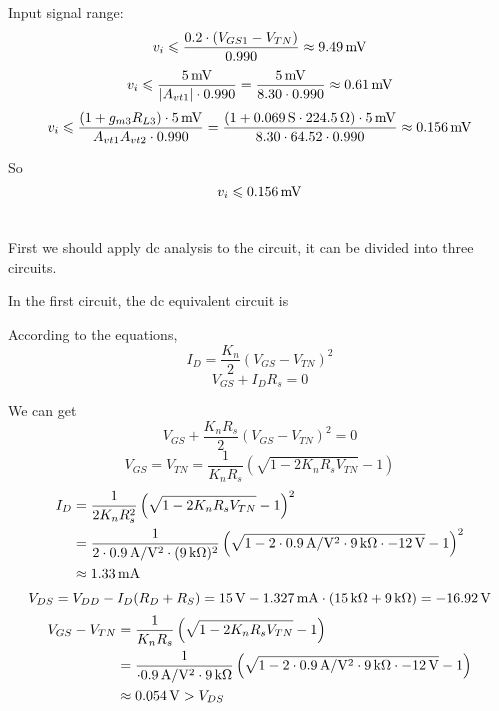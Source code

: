 \documentclass{article}
\newcommand{\unit}[1]{{\rm\,#1}}
\begin{document}
Input signal range:
$$v_i\leqslant\frac{0.2\cdot(V_{GS1}-V_{TN})}{0.990}\approx9.49\unit{mV}$$
$$v_i\leqslant\frac{5\unit{mV}}{|A_{vt1}|\cdot0.990}=\frac{5\unit{mV}}{8.30\cdot0.990}\approx0.61\unit{mV}$$
$$v_i\leqslant\frac{(1+g_{m3}R_{L3})\cdot5\unit{mV}}{A_{vt1}A_{vt2}\cdot0.990}=\frac{(1+0.069\unit{S}\cdot224.5\unit{\Omega})\cdot5\unit{mV}}{8.30\cdot64.52\cdot0.990}\approx0.156\unit{mV}$$

So $$v_i\leqslant0.156\unit{mV}$$

\section{}
First we should apply dc analysis to the circuit, it can be divided into three circuits.

In the first circuit, the dc equivalent circuit is
\begin{center}
\end{center}

According to the equations,
$$I_D=\frac{K_n}{2}(V_{GS}-V_{TN})^2$$
$$V_{GS}+I_DR_s=0$$

We can get $$V_{GS}+\frac{K_nR_s}{2}(V_{GS}-V_{TN})^2=0$$
$$V_{GS}=V_{TN}=\frac{1}{K_nR_s}\left(\sqrt{1-2K_nR_sV_{TN}}-1\right)$$
\begin{align*}
I_D&=\frac{1}{2K_nR_s^2}\left(\sqrt{1-2K_nR_sV_{TN}}-1\right)^2\\
&=\frac{1}{2\cdot0.9\unit{A/V^2}\cdot(9\unit{k\Omega})^2}\left(\sqrt{1-2\cdot0.9\unit{A/V^2}\cdot9\unit{k\Omega}\cdot-12\unit{V}}-1\right)^2\\
&\approx1.33\unit{mA}
\end{align*}
$$V_{DS}=V_{DD}-I_D(R_D+R_S)=15\unit{V}-1.327\unit{mA}\cdot(15\unit{k\Omega}+9\unit{k\Omega})=-16.92\unit{V}$$
\begin{align*}
V_{GS}-V_{TN}&=\frac{1}{K_nR_s}\left(\sqrt{1-2K_nR_sV_{TN}}-1\right)\\
&=\frac{1}{\cdot0.9\unit{A/V^2}\cdot9\unit{k\Omega}}\left(\sqrt{1-2\cdot0.9\unit{A/V^2}\cdot9\unit{k\Omega}\cdot-12\unit{V}}-1\right)\\
&\approx0.054\unit{V}>V_{DS}
\end{align*}
\end{document}

